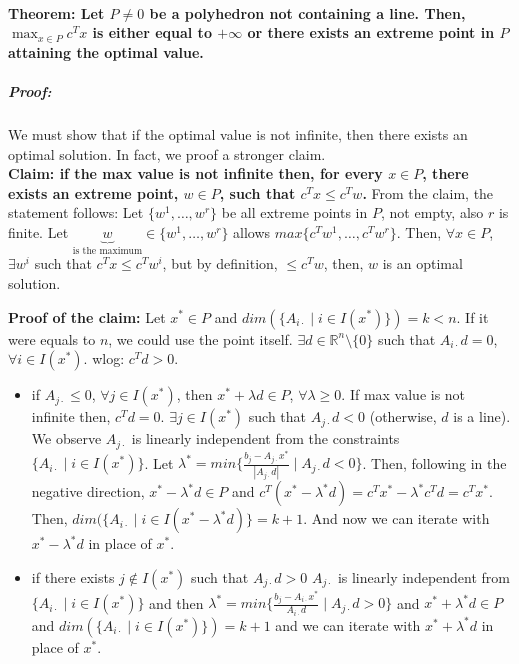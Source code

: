 \documentclass[main]{subfiles}
\begin{document}
\paragraph{Theorem: Let $P \neq 0$ be a polyhedron not containing a line. Then,
$\displaystyle \max_{x \in P} c^{T}x$ is either equal to $+ \infty$ or there
exists an extreme point in $P$ attaining the optimal value.}

\subparagraph{Proof:}
We must show that if the optimal value is not infinite, then there exists an
optimal solution. In fact, we proof a stronger claim. \\

\textbf{Claim: if the max value is not infinite then, for every $x \in P$,
there exists an extreme point, $w \in P$, such that $c^{T}x \leq c^{T}w$.}
From the claim, the statement follows:
Let $\{w^{1}, \dots, w^{r}\}$ be all extreme points in $P$, not empty, also $r$
is finite. Let $\underbrace{w}_{\text{is the maximum}} \in \{w^{1}, \dots,
w^{r}\}$ allows $max \{c^{T}w^{1}, \dots, c^{T}w^{r} \}$.
Then, $\forall x \in P$, $ \exists w^{i}$ such that $c^{T}x \leq c^{T}w^{i}$,
but by definition, $\leq c^{T}w$, then, $w$ is an optimal solution.

\begin{adjustwidth}{2.5em}{0pt}
\textbf{Proof of the claim:}
Let $x^{*} \in P$ and $dim(\{A_{i\cdot} \mid i \in I(x^{*})\}) = k < n$. If it
were equals to $n$, we could use the point itself. $\exists d \in \mathbb{R}
^{n} \setminus \{0\}$ such that $A_{i\cdot}d = 0$, $\forall i \in I(x^{*})$.
wlog: $c^{T}d > 0$.

\begin{itemize}
\item if $A_{j\cdot} \leq 0$, $\forall j \in I(x^{*})$, then
\subitem $x^{*} + \lambda d \in P$, $\forall \lambda \geq 0$.
If max value is not infinite then, $c^{T}d = 0$.
$\exists j \in I(x^{*})$ such that $A_{j\cdot} d < 0$ (otherwise, $d$ is a
line).
We observe $A_{j\cdot}$ is linearly independent from the constraints
$\{A_{i\cdot} \mid i \in I(x^{*})\}$.
Let $\lambda^{*} = min\{\frac{b_{j} - A_{j\cdot}x^{*}}{|A_{j\cdot}d|} \mid
A_{j\cdot}d < 0 \}$.
Then, following in the negative direction, $x^{*} - \lambda^{*} d \in P$ and
$c^{T}(x^{*} - \lambda^{*}d) = c^{T}x^{*} - \lambda^{*}c^{T}d = c^{T}x^{*}$.
Then, $dim(\{A_{i\cdot} \mid i \in I(x^{*} - \lambda^{*}d)\} = k+ 1$. And now
we can iterate with $x^{*} - \lambda^{*}d$ in place of $x^{*}$.
\item if there exists $j \notin I(x^{*})$ such that $A_{j\cdot}d > 0$
\subitem $A_{j\cdot}$ is linearly independent from $\{A_{i\cdot} \mid i \in
I(x^{*})\}$ and then $\lambda^{*} = min \{ \frac{b_{j} - A_{i\cdot} x^{*}}
{A_{i\cdot}d} \mid A_{j\cdot}d > 0 \}$ and $x^{*} + \lambda^{*}d \in P$ and
$dim(\{A_{i\cdot} \mid i \in I(x^{*})\}) = k+ 1$ and we can iterate with $x^{*}
+ \lambda^{*}d$ in place of $x^{*}$.
\end{itemize}
\end{adjustwidth}
\end{document}
